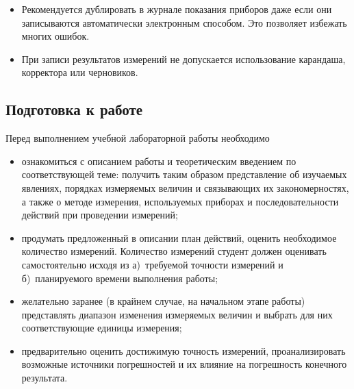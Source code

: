 \begin{itemize}
    \item Рекомендуется дублировать в журнале показания приборов даже если они
записываются автоматически электронным способом. Это позволяет избежать многих
ошибок.

    \item При записи результатов измерений не допускается использование карандаша, корректора или черновиков.
\end{itemize}

\subsection{Подготовка к работе}

Перед выполнением учебной лабораторной работы необходимо
\begin{itemize}
    \item ознакомиться с описанием работы и теоретическим введением по
соответствующей теме: получить таким образом представление об
изучаемых явлениях, порядках измеряемых величин и связывающих их закономерностях,
а также о методе измерения, используемых приборах и последовательности
действий при проведении измерений;


    \item продумать предложенный в описании план действий, оценить необходимое
    количество измерений. Количество измерений студент должен оценивать
    самостоятельно исходя из а)~требуемой точности измерений и б)~планируемого времени выполнения работы;

    \item желательно заранее (в крайнем случае, на начальном этапе работы)
    представлять диапазон изменения измеряемых величин и выбрать для них
    соответствующие единицы измерения;

    \item предварительно оценить достижимую точность
    измерений, проанализировать возможные источники погрешностей и их
    влияние на погрешность конечного результата.
\end{itemize}

